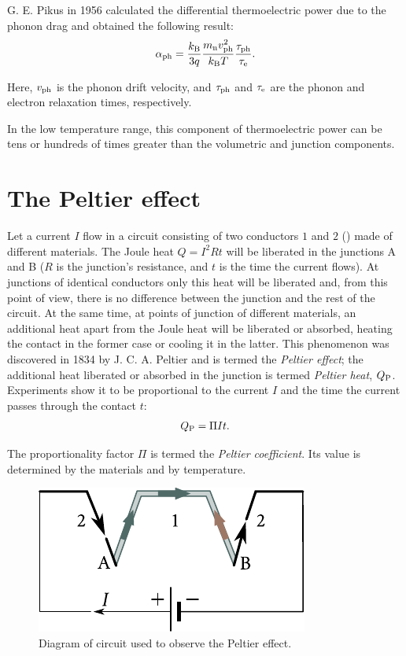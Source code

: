 G. E. Pikus in 1956 calculated the differential thermoelectric power due to the phonon drag and obtained the following result:
\begin{equation}\label{eq:9_20}
    \alpha_{\text{ph}} = \frac{k_{\text{B}}}{3q} \frac{m_{\text{n}}v_{\text{ph}}^2}{k_{\text{B}}T} \frac{\tau_{\text{ph}}}{\tau_{\text{e}}}.
\end{equation}

\noindent
Here, $v_{\text{ph}}$ is the phonon drift velocity, and $\tau_{\text{ph}}$ and $\tau_{\text{e}}$ are the phonon and electron relaxation times, respectively.

In the low temperature range, this component of thermoelectric power can be tens or hundreds of times greater than the volumetric and junction components.

\section{The Peltier effect}\label{sec:80}

Let a current $I$ flow in a circuit consisting of two conductors $1$ and $2$ () made of different materials. The Joule heat $Q=I^2R t$ will be liberated in the junctions A and B ($R$ is the junction's resistance, and $t$ is the time the current flows). At junctions of identical conductors only this heat will be liberated and, from this point of view, there is no difference between the junction and the rest of the circuit. At the same time, at points of junction of different materials, an additional heat apart from the Joule heat will be liberated or absorbed, heating the contact in the former case or cooling it in the latter. This phenomenon was discovered in 1834 by J. C. A. Peltier and is termed the \textit{Peltier effect}; the additional heat liberated or absorbed in the junction is termed \textit{Peltier heat}, $Q_{\text{P}}$. Experiments show it to be proportional to the current $I$ and the time the current passes through the contact $t$:
\begin{equation}\label{eq:9_21}
    Q_{\text{P}} = \Pi I t.
\end{equation}

\noindent
The proportionality factor $\Pi$ is termed the \textit{Peltier coefficient}. Its value is determined by the materials and by temperature.

\begin{figure}[t]
	\begin{center}
		\includegraphics[scale=1]{figures/ch_09/fig_9_3.pdf}
		\caption[]{Diagram of circuit used to observe the Peltier effect.}
		\label{fig:9_3}
	\end{center}
	\vspace{-0.8cm}
\end{figure}


